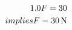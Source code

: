 \documentclass[preview]{standalone}
\begin{document}
\begin{align*}
\special{dvisvgm:raw <g id='unique000'>}1.0F = 30 \\implies F = 30\,\mathrm{N}\special{dvisvgm:raw </g>}
\end{align*}
\end{document}
